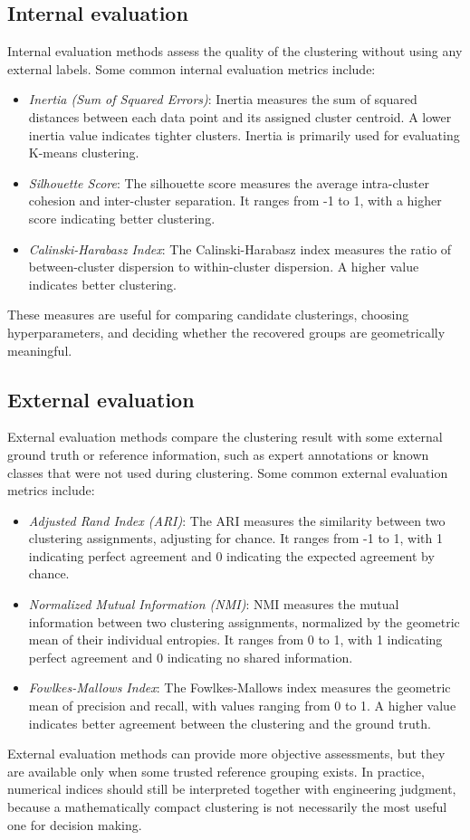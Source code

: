 \documentclass[12pt]{article}
\begin{document}
\subsection{Internal evaluation}
 Internal evaluation methods assess the quality of the clustering without using any external labels. Some common internal evaluation metrics include:
    \begin{itemize}
      \item \textit{Inertia (Sum of Squared Errors)}: Inertia measures the sum of squared distances between each data point and its assigned cluster centroid. A lower inertia value indicates tighter clusters. Inertia is primarily used for evaluating K-means clustering.
      \item \textit{Silhouette Score}: The silhouette score measures the average intra-cluster cohesion and inter-cluster separation. It ranges from -1 to 1, with a higher score indicating better clustering.
      \item \textit{Calinski-Harabasz Index}: The Calinski-Harabasz index measures the ratio of between-cluster dispersion to within-cluster dispersion. A higher value indicates better clustering.
    \end{itemize}
  These measures are useful for comparing candidate clusterings, choosing hyperparameters, and deciding whether the recovered groups are geometrically meaningful.


\subsection{External evaluation}
External evaluation methods compare the clustering result with some external ground truth or reference information, such as expert annotations or known classes that were not used during clustering. Some common external evaluation metrics include:

    \begin{itemize}
      \item \textit{Adjusted Rand Index (ARI)}: The ARI measures the similarity between two clustering assignments, adjusting for chance. It ranges from -1 to 1, with 1 indicating perfect agreement and 0 indicating the expected agreement by chance.
      \item \textit{Normalized Mutual Information (NMI)}: NMI measures the mutual information between two clustering assignments, normalized by the geometric mean of their individual entropies. It ranges from 0 to 1, with 1 indicating perfect agreement and 0 indicating no shared information.
      \item \textit{Fowlkes-Mallows Index}: The Fowlkes-Mallows index measures the geometric mean of precision and recall, with values ranging from 0 to 1. A higher value indicates better agreement between the clustering and the ground truth.
    \end{itemize}
  External evaluation methods can provide more objective assessments, but they are available only when some trusted reference grouping exists. In practice, numerical indices should still be interpreted together with engineering judgment, because a mathematically compact clustering is not necessarily the most useful one for decision making.
\end{document}
